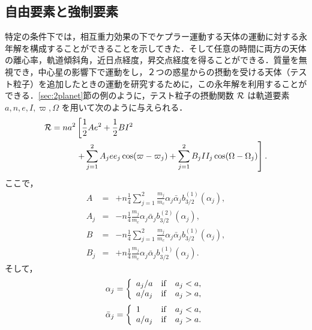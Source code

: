 \documentclass[11pt,a4paper,oneside,onecolumn]{jreport}
\begin{document}
\subsection{自由要素と強制要素 \label{sec:free_forced}}
特定の条件下では，相互重力効果の下でケプラー運動する天体の運動に対する永年解を構成することができることを示してきた．そして任意の時間に両方の天体の離心率，軌道傾斜角，近日点経度，昇交点経度を得ることができる．質量を無視でき，中心星の影響下で運動をし，２つの惑星からの摂動を受ける天体（テスト粒子）を追加したときの運動を研究するために，この永年解を利用することができる．\ref{sec:2planet}節の例のように，テスト粒子の摂動関数 ${\cal R}$ は軌道要素 $a, n, e, I, \varpi, \Omega$ を用いて次のように与えられる．
\begin{equation}
\begin{split}
{\cal R} = n a^2 & \left[ \frac{1}{2} A e^2 + \frac{1}{2} B I^2 \right. \\
& \left. + \sum_{j = 1}^2  A_j e e_j \cos (\varpi - \varpi_j) + \sum_{j = 1}^2 B_j I I_j \cos (\Omega - \Omega_j) \right]. \\
\end{split} \label{}
\end{equation} 
ここで，
\begin{eqnarray}
A & = & + n \frac{1}{4} \sum_{j = 1}^2 \frac{m_j}{m_c} \alpha_j \bar{\alpha}_j b_{3/2}^{(1)} (\alpha_j), \label{eq:A_test} \\
A_j & = & - n \frac{1}{4} \frac{m_j}{m_c} \alpha_j \bar{\alpha}_j b_{3/2}^{(2)} (\alpha_j), \label{eq:A_j_test} \\
B & = & - n \frac{1}{4} \sum_{j = 1}^2 \frac{m_j}{m_c} \alpha_j \bar{\alpha}_j b_{3/2}^{(1)} (\alpha_j), \label{eq:B_test} \\
B_j & = & + n \frac{1}{4} \frac{m_j}{m_c} \alpha_j \bar{\alpha}_j b_{3/2}^{(1)} (\alpha_j). \label{eq:B_j_test}
\end{eqnarray}
そして，
\begin{equation}
\alpha_j = \left\{
\begin{array}{lll}
a_j / a & {\rm if} & a_j < a, \\
a / a_j & {\rm if} & a_j > a,
\end{array}
\right.
\end{equation}
\begin{equation}
\bar{\alpha}_j = \left\{
\begin{array}{lll}
1 & {\rm if} & a_j < a, \\
a / a_j & {\rm if} & a_j > a.
\end{array}
\right.
\end{equation}
\end{document}
